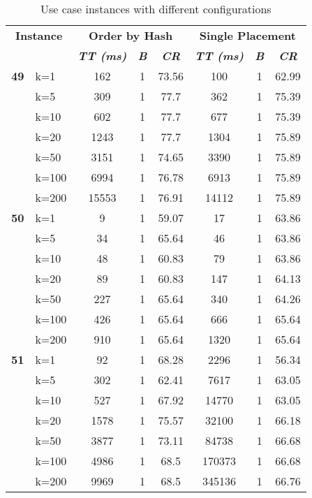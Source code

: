 \begin{table}[htbp]
    \caption{Use case instances with different configurations}
    \begin{tabular}{ll|ccc|ccc}
    
    \multicolumn{ 2}{c|}{\textbf{Instance}} & \multicolumn{ 3}{c|}{\textbf{Order by Hash}} & \multicolumn{ 3}{c}{\textbf{Single Placement}} \\ 
    \multicolumn{ 2}{l|}{} & \textbf{\textit{TT (ms)}} & \textbf{\textit{B}} & \textbf{\textit{CR}} & \textbf{\textit{TT (ms)}} & \textbf{\textit{B}} & \textbf{\textit{CR}} \\ \hline
    \multicolumn{1}{r}{\textbf{49}} & k=1 & 162 & 1 & 73.56 & 100 & 1 & 62.99 \\ 
     & k=5 & 309 & 1 & 77.7 & 362 & 1 & 75.39 \\ 
     & k=10 & 602 & 1 & 77.7 & 677 & 1 & 75.39 \\ 
     & k=20 & 1243 & 1 & 77.7 & 1304 & 1 & 75.89 \\ 
     & k=50 & 3151 & 1 & 74.65 & 3390 & 1 & 75.89 \\ 
     & k=100 & 6994 & 1 & 76.78 & 6913 & 1 & 75.89 \\ 
     & k=200 & 15553 & 1 & 76.91 & 14112 & 1 & 75.89 \\ \hline
    \multicolumn{1}{r}{\textbf{50}} & k=1 & 9 & 1 & 59.07 & 17 & 1 & 63.86 \\ 
     & k=5 & 34 & 1 & 65.64 & 46 & 1 & 63.86 \\ 
     & k=10 & 48 & 1 & 60.83 & 79 & 1 & 63.86 \\ 
     & k=20 & 89 & 1 & 60.83 & 147 & 1 & 64.13 \\ 
     & k=50 & 227 & 1 & 65.64 & 340 & 1 & 64.26 \\ 
     & k=100 & 426 & 1 & 65.64 & 666 & 1 & 65.64 \\ 
     & k=200 & 910 & 1 & 65.64 & 1320 & 1 & 65.64 \\ \hline
    \multicolumn{1}{r}{\textbf{51}} & k=1 & 92 & 1 & 68.28 & 2296 & 1 & 56.34 \\ 
     & k=5 & 302 & 1 & 62.41 & 7617 & 1 & 63.05 \\ 
     & k=10 & 527 & 1 & 67.92 & 14770 & 1 & 63.05 \\ 
     & k=20 & 1578 & 1 & 75.57 & 32100 & 1 & 66.18 \\ 
     & k=50 & 3877 & 1 & 73.11 & 84738 & 1 & 66.68 \\ 
     & k=100 & 4986 & 1 & 68.5 & 170373 & 1 & 66.68 \\ 
     & k=200 & 9969 & 1 & 68.5 & 345136 & 1 & 66.76 \\ \hline
    \end{tabular}
    \label{use_case_9}
    \end{table}
    
